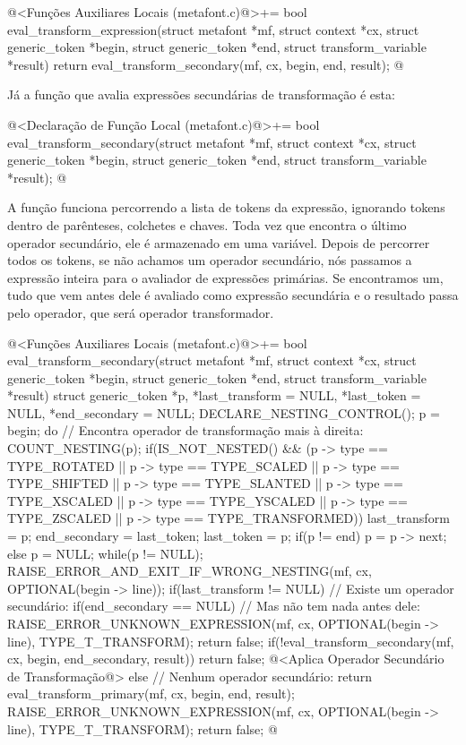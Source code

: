 \iniciocodigo
@<Funções Auxiliares Locais (metafont.c)@>+=
bool eval_transform_expression(struct metafont *mf, struct context *cx,
                               struct generic_token *begin,
                               struct generic_token *end,
                               struct transform_variable *result){
  return eval_transform_secondary(mf, cx, begin, end, result);
}
@
\fimcodigo

Já a função que avalia expressões secundárias de transformação é esta:

\iniciocodigo
@<Declaração de Função Local (metafont.c)@>+=
bool eval_transform_secondary(struct metafont *mf, struct context *cx,
                              struct generic_token *begin,
                              struct generic_token *end,
                              struct transform_variable *result);
@
\fimcodigo

A função funciona percorrendo a lista de tokens da expressão,
ignorando tokens dentro de parênteses, colchetes e chaves. Toda vez
que encontra o último operador secundário, ele é armazenado em uma
variável. Depois de percorrer todos os tokens, se não achamos um
operador secundário, nós passamos a expressão inteira para o avaliador
de expressões primárias. Se encontramos um, tudo que vem antes dele é
avaliado como expressão secundária e o resultado passa pelo operador,
que será operador transformador.

\iniciocodigo
@<Funções Auxiliares Locais (metafont.c)@>+=
bool eval_transform_secondary(struct metafont *mf, struct context *cx,
                              struct generic_token *begin,
                              struct generic_token *end,
                              struct transform_variable *result){
  struct generic_token *p, *last_transform = NULL, *last_token = NULL,
                       *end_secondary = NULL;
  DECLARE_NESTING_CONTROL();
  p = begin;
  do{ // Encontra operador de transformação mais à direita:
    COUNT_NESTING(p);
    if(IS_NOT_NESTED() &&
       (p -> type == TYPE_ROTATED || p -> type == TYPE_SCALED ||
        p -> type == TYPE_SHIFTED || p -> type == TYPE_SLANTED ||
        p -> type == TYPE_XSCALED || p -> type == TYPE_YSCALED ||
        p -> type == TYPE_ZSCALED || p -> type == TYPE_TRANSFORMED)){
      last_transform = p;
      end_secondary = last_token;
    }
    last_token = p;
    if(p != end)
      p = p -> next;
    else
      p = NULL;
  } while(p != NULL);
  RAISE_ERROR_AND_EXIT_IF_WRONG_NESTING(mf, cx, OPTIONAL(begin -> line));
  if(last_transform != NULL){ // Existe um operador secundário:
    if(end_secondary == NULL){ // Mas não tem nada antes dele:
      RAISE_ERROR_UNKNOWN_EXPRESSION(mf, cx, OPTIONAL(begin -> line),
                                     TYPE_T_TRANSFORM);
      return false;
    }
    if(!eval_transform_secondary(mf, cx, begin, end_secondary, result))
      return false;
    @<Aplica Operador Secundário de Transformação@>
  }
  else // Nenhum operador secundário:
    return eval_transform_primary(mf, cx, begin, end, result);
  RAISE_ERROR_UNKNOWN_EXPRESSION(mf, cx, OPTIONAL(begin -> line),
                                 TYPE_T_TRANSFORM);
  return false;
}
@
\fimcodigo

